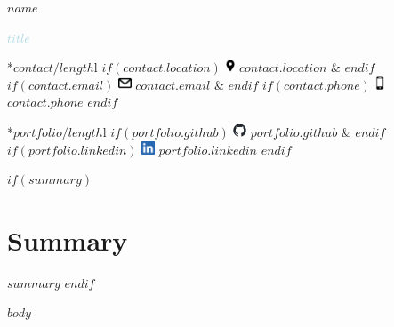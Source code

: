 \documentclass[10pt]{article}
\begin{document}
\begin{center}
{\Huge \textbf{$name$}}

{\Large \textcolor{lightblue}{$title$}}

\begin{tabular}{*{$contact/length$}{l}}
    $if(contact.location)$
        \includegraphics[height=11pt]{logos/location.png} $contact.location$ &
    $endif$
    $if(contact.email)$
        \includegraphics[height=11pt]{logos/mail.png} $contact.email$ &
    $endif$
    $if(contact.phone)$
        \includegraphics[height=11pt]{logos/mobile.png} $contact.phone$
    $endif$
\end{tabular}

\begin{tabular}{*{$portfolio/length$}{l}}
    $if(portfolio.github)$
        \includegraphics[height=11pt]{logos/github-mark.png} $portfolio.github$ &
    $endif$
    $if(portfolio.linkedin)$
        \includegraphics[height=11pt]{logos/LI-In-Bug.png} $portfolio.linkedin$
    $endif$
\end{tabular}
\end{center}

$if(summary)$
\section{Summary}
$summary$
$endif$

\bigskip

$body$
\end{document}

